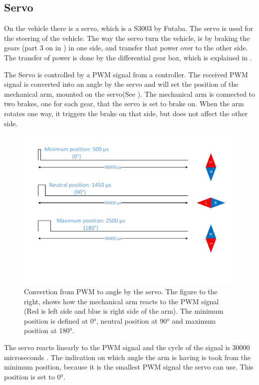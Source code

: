 \subsection{Servo} \label{Servo}
On the vehicle there is a servo, which is a S3003 by Futaba. 
The servo is used for the steering of the vehicle. The way the servo turn the vehicle, is by braking the gears (part 3 on  in ) in one side, and transfer that power over to the other side. The transfer of power is done by the differential gear box, which is explained in .

The Servo is controlled by a PWM signal from a controller. The received PWM signal is converted into an angle by the servo and will set the position of the mechanical arm, mounted on the servo(See ). The mechanical arm is connected to two brakes, one for each gear, that the servo is set to brake on. When the arm rotates one way, it triggers the brake on that side, but does not affect the other side.

\begin{figure}[H]
	\centering
	\includegraphics[scale=0.6]{figures/TimeVSangle.pdf}
	\caption{Convertion from PWM to angle by the servo. The figure to the right, shows how the mechanical arm reacts to the PWM signal (Red is left side and blue is right side of the arm). The minimum position is defined at 0°, neutral position at 90° and maximum position at 180°.}
	\label{timeVSangle}
\end{figure}

The servo reacts linearly to the PWM signal and the cycle of the signal is 30000 microseconds . The indication on which angle the arm is having is took from the minimum position, because it is the smallest PWM signal the servo can use. This position is set to 0°.
 
